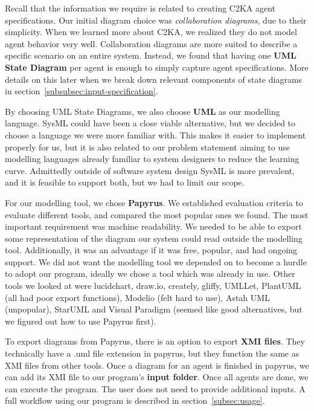 \documentclass[11pt]{article}
\begin{document}
    Recall that the information we require is related to creating C2KA agent specifications.
    Our initial diagram choice was \textit{collaboration diagrams}, due to their simplicity. 
    When we learned more about C2KA, we realized they do not model agent behavior very well.
    Collaboration diagrams are more suited to describe a specific scenario on an entire system.
    Instead, we found that having one \textbf{UML State Diagram} per agent is enough to simply capture agent specifications.
    More details on this later when we break down relevant components of state diagrams in section~\ref{subsubsec:input-specification}.

    By choosing UML State Diagrams, we also choose \textbf{UML} as our modelling language.
    SysML could have been a close viable alternative, but we decided to choose a language we were more familiar with.
    This makes it easier to implement properly for us,
    but it is also related to our problem statement aiming to use modelling languages already familiar to system designers to reduce the learning curve.
    Admittedly outside of software system design SysML is more prevalent, and it is feasible to support both, but we had to limit our scope.

    For our modelling tool, we chose \textbf{Papyrus}.
    We established evaluation criteria to evaluate different tools, and compared the most popular ones we found.
    The most important requirement was machine readability.
    We needed to be able to export some representation of the diagram our system could read outside the modelling tool.
    Additionally, it was an advantage if it was free, popular, and had ongoing support.
    We did not want the modelling tool we depended on to become a hurdle to adopt our program,
    ideally we chose a tool which was already in use.
    Other tools we looked at were lucidchart, draw.io, creately, gliffy, UMLLet, PlantUML (all had poor export functions),
    Modelio (felt hard to use), Astah UML (unpopular),
    StarUML and Visual Paradigm (seemed like good alternatives, but we figured out how to use Papyrus first).

    To export diagrams from Papyrus, there is an option to export \textbf{XMI files}.
    They technically have a .uml file extension in papyrus, but they function the same as XMI files from other tools.
    Once a diagram for an agent is finished in papyrus, we can add its XMI file to our program's \textbf{input folder}.
    Once all agents are done, we can execute the program.
    The user does not need to provide additional inputs.
    A full workflow using our program is described in section~\ref{subsec:usage}.
\end{document}
